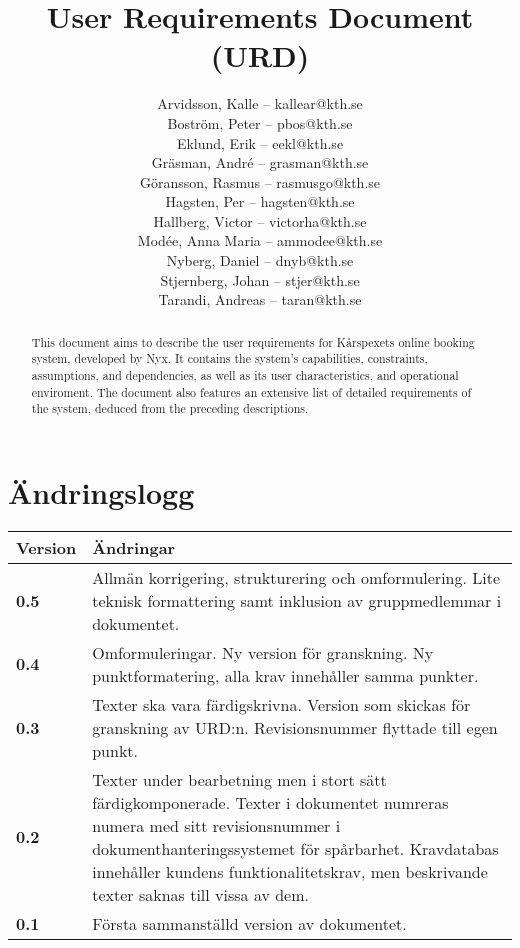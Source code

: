 \documentclass[a4paper, twoside, 11pt, titlepage]{article}
\author{
	\small
	Arvidsson, Kalle -- kallear@kth.se\\
	Boström, Peter -- pbos@kth.se\\
	Eklund, Erik -- eekl@kth.se\\
	Gräsman, André -- grasman@kth.se\\
	Göransson, Rasmus -- rasmusgo@kth.se\\
	Hagsten, Per -- hagsten@kth.se\\
	Hallberg, Victor -- victorha@kth.se\\
	Modée, Anna Maria -- ammodee@kth.se\\
	Nyberg, Daniel -- dnyb@kth.se\\
	Stjernberg, Johan -- stjer@kth.se\\
	Tarandi, Andreas -- taran@kth.se
	}
\title{User Requirements Document (URD)}
\begin{document}
\maketitle

\begin{abstract}
	This document aims to describe the user requirements for Kårspexets online booking system, developed by Nyx. It contains the system's capabilities, constraints, assumptions, and dependencies, as well as its user characteristics, and operational enviroment. The document also features an extensive list of detailed requirements of the system, deduced from the preceding descriptions.
\end{abstract}

\newpage

\tableofcontents

\clearpage
\setcounter{page}{1}

\startfooter

\clearpage
\section*{Ändringslogg}


\begin{tabular} { p{2.6cm} p{12.5cm} }
	\hline
	\sffamily\textbf{Version} & \sffamily\textbf{Ändringar } \\
	\hline
	\sffamily\textbf{0.5} & Allmän korrigering, strukturering och omformulering. Lite teknisk formattering samt inklusion av gruppmedlemmar i dokumentet.  \\
	\hline
	\sffamily\textbf{0.4} & Omformuleringar. Ny version för granskning. Ny punktformatering, alla krav innehåller samma punkter.  \\
	\hline
	\sffamily\textbf{0.3} & Texter ska vara färdigskrivna. Version som skickas för granskning av URD:n. Revisionsnummer flyttade till egen punkt.  \\
	\hline
	\sffamily\textbf{0.2} & Texter under bearbetning men i stort sätt färdigkomponerade. Texter i dokumentet numreras numera med sitt revisionsnummer i dokumenthanteringssystemet för spårbarhet. Kravdatabas innehåller kundens funktionalitetskrav, men beskrivande texter saknas till vissa av dem.   \\
	\hline
	\sffamily\textbf{0.1} & Första sammanställd version av dokumentet.  \\
	\hline
\end{tabular}
\end{document}
